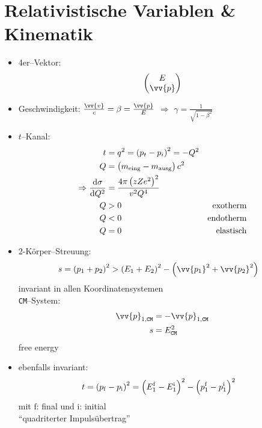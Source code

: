 \documentclass[BCOR=5mm,DIV=calc,listof=totoc,headings=big]{scrartcl}
\newcommand{\abl}[2]{\frac{\mathrm{d} #1}{\mathrm{d} #2}}
\begin{document}
\section{Relativistische Variablen \& Kinematik}
\label{sec:relat-vari-}
\begin{itemize}
\item 4er--Vektor:
  \begin{align*}
    \begin{pmatrix}
      E \\ \vv{p}
    \end{pmatrix}
  \end{align*}
\item Geschwindigkeit: $\frac{\vv{v}}{c}=\beta=\frac{\vv{p}}{E}$
  $\Rightarrow$ $\gamma=\frac{1}{\sqrt{1-\beta^{2}}}$
\item $t$--Kanal:
  \begin{align*}
    t&=q^{2}=\del{p_{t}-p_{i}}^{2}=-Q^{2}\\
    Q&=\del{m_{\text{eing}}-m_{\text{ausg}}}c^{2}\\
    \Rightarrow \abl{\sigma}{Q^{2}}&=\frac{4\pi
      \del{zZe^{2}}^{2}}{v^{2}Q^{4}}\\
    Q&>0 & \text{exotherm}\\
    Q&<0 & \text{endotherm}\\
    Q&=0 & \text{elastisch}
  \end{align*}
\item 2-Körper--Streuung:
  \begin{align*}
    s&=\del{p_{1}+p_{2}}^{2} > \del{E_{1}+E_{2}}^{2}-\del{\vv{p_{1}}^{2}+\vv{p_{2}}^{2}}
  \end{align*}
  invariant in allen Koordinatensystemen\\
  \texttt{CM}--System:
  \begin{align*}
    \vv{p}_{1,\mathtt{CM}}&=-\vv{p}_{1,\mathtt{CM}}\\
    s&=E_{\mathtt{CM}}^{2}
  \end{align*}
  free energy
\item ebenfalls invariant:
  \begin{align*}
    t&=\del{p_{\mathrm{f}}-p_{\mathrm{i}}}^{2}=\del{E_{1}^{\mathrm{f}}-E_{1}^{\mathrm{i}}}^{2}-\del{p_{1}^{\mathrm{f}}-p_{1}^{\mathrm{i}}}^{2}
  \end{align*}
  mit $\mathrm{f}$: final und $\mathrm{i}$: initial\\
  "`quadriterter Impulsübertrag"'
\end{itemize}
\end{document}

